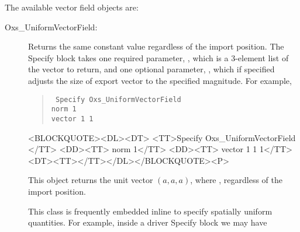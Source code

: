 \noindent
The available vector field objects are:
\begin{description}
\item[Oxs\_UniformVectorField:\label{item:UniformVectorField}]
%
   Returns the same constant value regardless of the import position.
   The Specify block takes one required parameter, ,
   which is a 3-element list of the vector to return, and one optional
   parameter, , which if specified adjusts the size of
   export vector to the specified magnitude.  For example,
   \begin{latexonly}
   \begin{quote}\tt
      Specify Oxs\_UniformVectorField \ocb\\
      \bi norm 1\\
      \bi vector  1 1\ccb\\
      \ccb
   \end{quote}
   \end{latexonly}
   \begin{rawhtml}
   <BLOCKQUOTE><DL><DT>
      <TT>Specify Oxs_UniformVectorField {</TT>
      <DD><TT> norm 1</TT>
      <DD><TT> vector {1 1 1}</TT>
   <DT><TT>}</TT></DL></BLOCKQUOTE><P>
   \end{rawhtml}
   This object returns the unit vector $(a,a,a)$, where
   , regardless of the import
   position.

   This class is frequently embedded inline to specify spatially uniform
   quantities.  For example, inside a driver Specify block we may have


\end{description}
